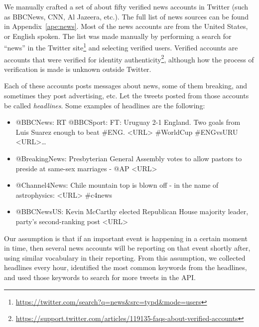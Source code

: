 We manually crafted a set of about fifty verified news accounts in Twitter (such
as BBCNews, CNN, Al Jazeera, etc.). 
%
The full list of news sources can be found in Appendix~\ref{ape:news}.
%
Most of the news accounts are from the United States, or English spoken.
%
The list was made manually by performing a search for ``news'' in the Twitter
site\footnote{\url{https://twitter.com/search?q=news&src=typd&mode=users}} and
selecting verified users. 
%
Verified accounts are accounts that were verified for identity
authenticity\footnote{\url{https://support.twitter.com/articles/119135-faqs-about-verified-accounts}},
although how the process of verification is made is unknown outside Twitter. 

Each of these accounts posts messages about news, some of them breaking, and
sometimes they post advertising, etc. 
%
Let the tweets posted from those accounts be called \emph{headlines}. Some
examples of headlines are the following: 

{\it 
\begin{itemize}
\item @BBCNews: RT @BBCSport: FT: Uruguay 2-1 England. Two goals from
  Luis Suarez enough to beat \#ENG. <URL> \#WorldCup
  \#ENGvsURU <URL>…
\item @BreakingNews: Presbyterian General Assembly votes to allow
  pastors to preside at same-sex marriages - @AP
  <URL>
\item @Channel4News: Chile mountain top is blown off - in the name of
  astrophysics: <URL> \#c4news
\item @BBCNewsUS: Kevin McCarthy elected Republican House majority
  leader, party's second-ranking post <URL>
\end{itemize}
}

Our assumption is that if an important event is happening in a certain moment in
time, then several news accounts will be reporting on that event shortly after,
using similar vocabulary in their reporting.
%
From this assumption, we collected headlines every hour, identified the most
common keywords from the headlines, and used those keywords to search for more
tweets in the API.

